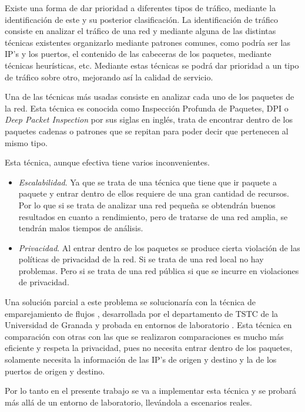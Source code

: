 \intro Existe una forma de dar prioridad a diferentes tipos de tráfico, mediante la identificación de este y su posterior 
clasificación. La identificación de tráfico consiste en analizar el tráfico de una red y mediante alguna de las distintas 
técnicas existentes organizarlo mediante patrones comunes, como podría ser las IP's y los puertos, el contenido de las 
cabeceras de los paquetes, mediante técnicas heurísticas, etc. Mediante estas técnicas se podrá dar prioridad a un tipo 
de tráfico sobre otro, mejorando así la calidad de servicio.

\intro Una de las técnicas más usadas consiste en analizar cada uno de los paquetes de la red. Esta técnica es conocida como 
Inspección Profunda de Paquetes, DPI o \textit{Deep Packet Inspection} \cite{dpiaproximacion} por sus siglas en inglés, 
trata de encontrar dentro de los paquetes cadenas o patrones que se repitan para poder decir que pertenecen al mismo tipo. 

\intro Esta técnica, aunque efectiva tiene varios inconvenientes.
\begin{itemize}
\item \textit{Escalabilidad}. Ya que se trata de una técnica que tiene que ir paquete a paquete y entrar dentro de ellos requiere de 
una gran cantidad de recursos. Por lo que si se trata de analizar una red pequeña se obtendrán buenos resultados en cuanto a 
rendimiento, pero de tratarse de una red amplia, se tendrán malos tiempos de análisis.
\item \textit{Privacidad}. Al entrar dentro de los paquetes se produce cierta violación de las políticas de privacidad de la red. Si 
se trata de una red local no hay problemas. Pero si se trata de una red pública si que se incurre en violaciones de privacidad.
\end{itemize}

\intro Una solución parcial a este problema se solucionaría con la técnica de emparejamiento de flujos \cite{presentacion}, 
desarrollada por el departamento de TSTC de la Universidad de Granada y probada en entornos de laboratorio \cite{comparacion}. 
Esta técnica en comparación con otras con las que se realizaron comparaciones es mucho más eficiente y respeta la privacidad, 
pues no necesita entrar dentro de los paquetes, solamente necesita la información de las IP's de origen y destino y la de los 
puertos de origen y destino.

\intro Por lo tanto en el presente trabajo se va a implementar esta técnica y se probará más allá de un entorno de laboratorio, 
llevándola a escenarios reales.

